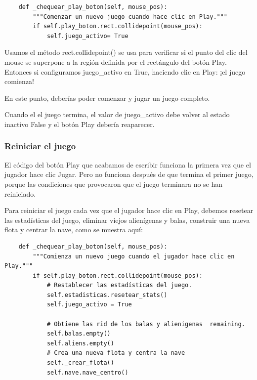 \hspace{-2.4cm}{\ttfamily \scriptsize invasión}

\vspace{-0.2cm}
\hspace{-2.1cm}{\ttfamily \scriptsize \_alien.py}\vspace{-0.84cm}
\begin{lstlisting}	
    def _chequear_play_boton(self, mouse_pos):
        """Comenzar un nuevo juego cuando hace clic en Play."""
        if self.play_boton.rect.collidepoint(mouse_pos):
            self.juego_activo= True
\end{lstlisting}

Usamos el método {\ttfamily rect.collidepoint()} se usa  para verificar si el punto del clic del mouse se superpone a la región definida por el rectángulo del botón Play.  Entonces si configuramos {\ttfamily juego\_activo}  en  True, haciendo clic en Play:   ¡el juego comienza!


En este punto, deberías poder comenzar y jugar un juego completo. 

Cuando el el juego termina, el valor de {\ttfamily juego\_activo} debe volver al estado inactivo  {\ttfamily False } y el botón Play
debería reaparecer. 


\subsubsection{Reiniciar el juego}

El código del botón Play que acabamos de escribir funciona la primera vez que el jugador hace clic Jugar. 
Pero no funciona después de que termina el primer juego, porque las condiciones que provocaron que el juego 
terminara no se han reiniciado.

Para reiniciar el juego cada vez que el jugador hace clic en Play, debemos resetear las
estadísticas del juego, eliminar viejos alienígenas y balas, construir una nueva flota y
centrar la nave, como se muestra aquí:


\hspace{-2.4cm}{\ttfamily \scriptsize invasión}

\vspace{-0.2cm}
\hspace{-2.1cm}{\ttfamily \scriptsize \_alien.py}\vspace{-0.84cm}
\begin{lstlisting}	
    def _chequear_play_boton(self, mouse_pos):
        """Comienza un nuevo juego cuando el jugador hace clic en Play."""
        if self.play_boton.rect.collidepoint(mouse_pos):
            # Restablecer las estadísticas del juego.
            self.estadisticas.resetear_stats()
            self.juego_activo = True

            # Obtiene las rid de los balas y alienigenas  remaining.
            self.balas.empty()
            self.aliens.empty()
            # Crea una nueva flota y centra la nave
            self._crear_flota()
            self.nave.nave_centro()
\end{lstlisting}



